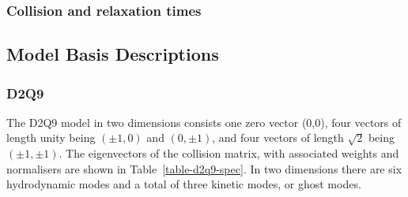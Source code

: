 \subsubsection{Collision and relaxation times}



\subsection{Model Basis Descriptions}

\subsubsection{D2Q9}

The D2Q9 model in two dimensions consists one zero vector (0,0), four
vectors of length unity being $(\pm 1,0)$ and $(0, \pm 1)$, and four
vectors of length $\sqrt{2}$ being $(\pm 1, \pm 1)$. The eigenvectors of
the collision matrix, with associated weights and normalisers are shown
in Table~\ref{table-d2q9-spec}. In two dimensions there are six hydrodynamic
modes and a total of three kinetic modes, or ghost modes.

